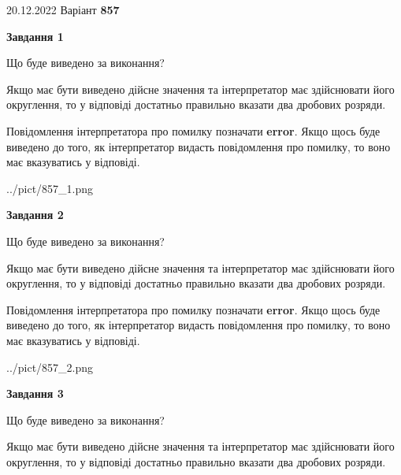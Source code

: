 \documentclass[12pt, ukrainian]{article}
\begin{document}
{20.12.2022 Варіант \No \textbf { 857 }\par}
{
\begin {Large}

{\begin {center}\textbf{Завдання 1}\end {center}}\par
Що буде виведено за виконання? \par

Якщо має бути виведено дійсне значення та інтерпретатор має здійснювати його округлення, 
то у відповіді достатньо правильно вказати два дробових розряди.

Повідомлення інтерпретатора про помилку позначати \textbf{error}.
Якщо щось буде виведено до того, як інтерпретатор видасть повідомлення про помилку, 
то воно має вказуватись у відповіді. \par

\begin{center}
	{../pict/857_1.png}
\end{center}
\newpage

{\begin {center}\textbf{Завдання 2}\end {center}}\par
Що буде виведено за виконання? \par

Якщо має бути виведено дійсне значення та інтерпретатор має здійснювати його округлення, 
то у відповіді достатньо правильно вказати два дробових розряди.

Повідомлення інтерпретатора про помилку позначати \textbf{error}.
Якщо щось буде виведено до того, як інтерпретатор видасть повідомлення про помилку, 
то воно має вказуватись у відповіді. \par

\begin{center}
	{../pict/857_2.png}
\end{center}
\newpage

{\begin {center}\textbf{Завдання 3}\end {center}}\par
Що буде виведено за виконання? \par

Якщо має бути виведено дійсне значення та інтерпретатор має здійснювати його округлення, 
то у відповіді достатньо правильно вказати два дробових розряди.


\end{Large}}
\end{document}
